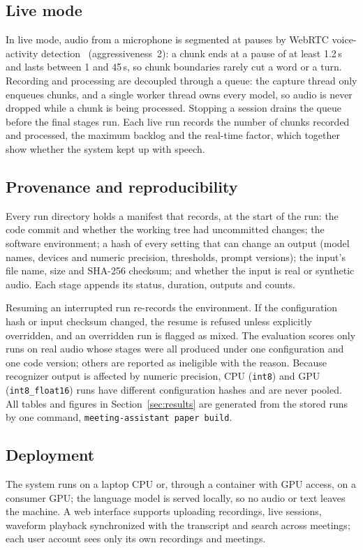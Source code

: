 \subsection{Live mode}
In live mode, audio from a microphone is segmented at pauses by
WebRTC voice-activity detection~\cite{webrtcvad} (aggressiveness~2): a chunk
ends at a pause of at least 1.2\,s and lasts between 1 and 45\,s, so chunk
boundaries rarely cut a word or a turn. Recording and processing are decoupled
through a queue: the capture thread only enqueues chunks, and a single worker
thread owns every model, so audio is never dropped while a chunk is being
processed. Stopping a session drains the queue before the final stages run. Each
live run records the number of chunks recorded and processed, the maximum
backlog and the real-time factor, which together show whether the system kept
up with speech.

\subsection{Provenance and reproducibility}
\label{sec:provenance}
Every run directory holds a manifest that records, at the start of the run: the
code commit and whether the working tree had uncommitted changes; the software
environment; a hash of every setting that can change an output (model names,
devices and numeric precision, thresholds, prompt versions); the input's file
name, size and SHA-256 checksum; and whether the input is real or synthetic
audio. Each stage appends its status, duration, outputs and counts.

Resuming an interrupted run re-records the environment. If the configuration
hash or input checksum changed, the resume is refused unless explicitly
overridden, and an overridden run is flagged as mixed. The evaluation scores only
runs on real audio whose stages were all produced under one configuration and
one code version; others are reported as ineligible with the reason. Because
recognizer output is affected by numeric precision, CPU (\texttt{int8}) and GPU
(\texttt{int8\_float16}) runs have different configuration hashes and are never
pooled. All tables and figures in Section~\ref{sec:results} are generated from
the stored runs by one command, \texttt{meeting-assistant paper build}.

\subsection{Deployment}
The system runs on a laptop CPU or, through a container with GPU access, on a
consumer GPU; the language model is served locally, so no audio or text leaves
the machine. A web interface supports uploading recordings, live sessions,
waveform playback synchronized with the transcript and search across meetings;
each user account sees only its own recordings and meetings.
